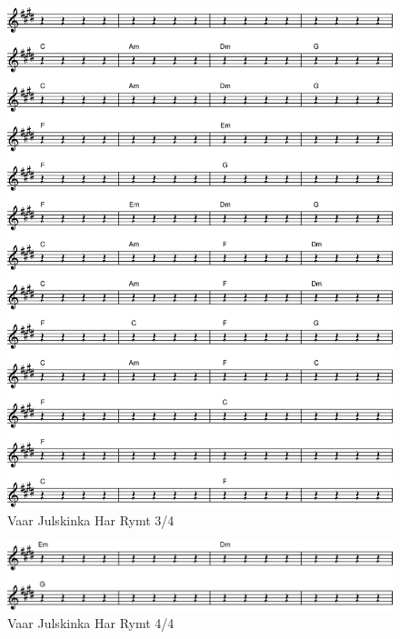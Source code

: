 \begin{figure}[!htbp]
  \includegraphics[width=\textwidth,height=\textheight,keepaspectratio]{../songs/xx_vaar_julskinka_har_rymt-2.png}
  \caption{Vaar Julskinka Har Rymt 3/4}
  \label{fig:xx_vaar_julskinka_har_rymt_3}
\end{figure}

\begin{figure}[!htbp]
  \includegraphics[width=\textwidth,height=\textheight,keepaspectratio]{../songs/xx_vaar_julskinka_har_rymt-3.png}
  \caption{Vaar Julskinka Har Rymt 4/4}
  \label{fig:xx_vaar_julskinka_har_rymt_4}
\end{figure}
